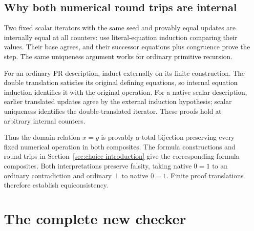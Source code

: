 \documentclass[11pt]{article}
\theoremstyle{definition}
\theoremstyle{remark}
\begin{document}
\subsection{Why both numerical round trips are internal}

Two fixed scalar iterators with the same seed and provably equal
updates are internally equal at all counters: use literal-equation
induction comparing their values. Their base agrees, and their
successor equations plus congruence prove the step. The same
uniqueness argument works for ordinary primitive recursion.

For an ordinary PR description, induct externally on its finite
construction. The double translation satisfies its original
defining equations, so internal equation induction identifies it
with the original operation. For a native scalar description,
earlier translated updates agree by the external induction
hypothesis; scalar uniqueness identifies the double-translated
iterator. These proofs hold at arbitrary internal counters.

Thus the domain relation $x=y$ is provably a total bijection
preserving every fixed numerical operation in both composites.
The formula constructions and round trips in
Section~\ref{sec:choice-introduction} give the corresponding formula
composites. Both interpretations preserve falsity, taking native
$0=1$ to an ordinary contradiction and ordinary $\bot$ to native
$0=1$. Finite proof translations therefore establish equiconsistency.


\section{The complete new checker}
\label{sec:listing}
\end{document}
